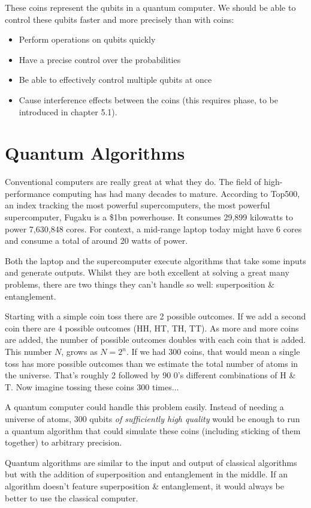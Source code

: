 \documentclass{book}
\begin{document}
These coins represent the qubits in a quantum computer. We should be able to control these qubits faster and more precisely than with coins:
\begin{itemize}
\item Perform operations on qubits quickly 
\item Have a precise control over the probabilities 
\item Be able to effectively control multiple qubits at once
\item Cause interference effects between the coins (this requires phase, to be introduced in chapter 5.1).
\end{itemize}

\section{Quantum Algorithms} 

 Conventional computers are really great at what they do. The field of high-performance computing has had many decades to mature. According to Top500, an index tracking the most powerful supercomputers, the most powerful supercomputer, Fugaku is a \$1bn powerhouse. It consumes 29,899 kilowatts to power 7,630,848 cores. For context, a mid-range laptop today might have 6 cores and consume a total of around 20 watts of power. 

 Both the laptop and the supercomputer execute algorithms that take some inputs and generate outputs. Whilst they are both excellent at solving a great many problems, there are two things they can't handle so well: superposition \& entanglement. 

 Starting with a simple coin toss there are 2 possible outcomes. If we add a second coin there are 4 possible outcomes (HH, HT, TH, TT). As more and more coins are added, the number of possible outcomes doubles with each coin that is added. This number $N$, grows as $N = 2^n$. If we had 300 coins, that would mean a single toss has more possible outcomes than we estimate the total number of atoms in the universe. That's roughly 2 followed by 90 0's different combinations of H \& T. Now imagine tossing these coins 300 times...

 A quantum computer could handle this problem easily. Instead of needing a universe of atoms, 300 qubits \textit{of sufficiently high quality} would be enough to run a quantum algorithm that could simulate these coins (including sticking of them together) to arbitrary precision. 

 Quantum algorithms are similar to the input and output of classical algorithms but with the addition of superposition and entanglement in the middle.  If an algorithm doesn't feature superposition \& entanglement, it would always be better to use the classical computer. 
\end{document}
